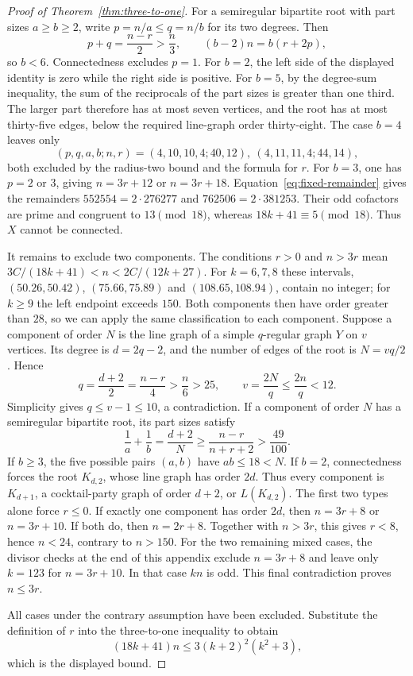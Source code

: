 \documentclass[a4paper,10pt,reqno]{amsart}
\theoremstyle{plain}
\theoremstyle{definition}
\theoremstyle{remark}
\begin{document}
\begin{proof}[Proof of Theorem~\ref{thm:three-to-one}]
 For a semiregular bipartite root with part sizes \(a\ge b\ge2\),
 write \(p=n/a\le q=n/b\) for its two degrees.  Then
 \[
  p+q=\frac{n-r}{2}>\frac n3,
  \qquad (b-2)n=b(r+2p),
 \]
 so \(b<6\).  Connectedness excludes \(p=1\).  For \(b=2\), the
 left side of the displayed identity is zero while the right side is
 positive.  For \(b=5\), by the degree-sum inequality, the sum of the
 reciprocals of the part sizes is greater than one third.  The larger part
 therefore has at most seven vertices, and the root has at most thirty-five
 edges, below the required line-graph order thirty-eight.  The case \(b=4\) leaves only
 \[
  (p,q,a,b;n,r)=(4,10,10,4;40,12),\ (4,11,11,4;44,14),
 \]
 both excluded by the radius-two bound and the formula for \(r\).
 For \(b=3\), one has \(p=2\) or \(3\), giving \(n=3r+12\) or
 \(n=3r+18\).  Equation~\eqref{eq:fixed-remainder} gives the remainders
 \(552554=2\cdot276277\) and \(762506=2\cdot381253\).  Their odd cofactors
 are prime and congruent to \(13\pmod {18}\), whereas \(18k+41\equiv5
 \pmod {18}\).  Thus \(X\) cannot be connected.

It remains to exclude two components. The conditions \(r>0\) and \(n>3r\)
mean \(3C/(18k+41)<n<2C/(12k+27)\). For \(k=6,7,8\) these intervals,
\((50.26,50.42)\), \((75.66,75.89)\) and \((108.65,108.94)\), contain no
integer; for \(k\ge9\) the left endpoint exceeds \(150\). Both components
then have order greater than \(28\), so
we can apply the same classification to each component.  Suppose a component
of order \(N\) is the line graph of a simple \(q\)-regular graph \(Y\)
on \(v\) vertices.  Its degree is \(d=2q-2\), and the number of edges
of the root is \(N=vq/2\).  Hence
\[
 q=\frac{d+2}{2}=\frac{n-r}{4}>\frac n6>25,
 \qquad
 v=\frac{2N}{q}\le\frac{2n}{q}<12.
\]
Simplicity gives \(q\le v-1\le10\), a contradiction.  If a component
of order \(N\) has a semiregular bipartite root, its part sizes satisfy
 \[
  \frac1a+\frac1b=\frac{d+2}{N}
  \ge\frac{n-r}{n+r+2}>\frac{49}{100}.
 \]
 If \(b\ge3\), the five possible pairs \((a,b)\) have \(ab\le18<N\).
 If \(b=2\), connectedness forces the root \(K_{d,2}\), whose line graph has
 order \(2d\).  Thus every component is \(K_{d+1}\), a cocktail-party graph
 of order \(d+2\), or \(L(K_{d,2})\).  The first two types alone force
 \(r\le0\).  If exactly one component has order \(2d\), then
\(n=3r+8\) or \(n=3r+10\). If both do, then \(n=2r+8\). Together with \(n>3r\), this gives \(r<8\), hence \(n<24\),
  contrary to \(n>150\). For the two remaining mixed cases,
  the divisor checks at the end of this appendix exclude
  \(n=3r+8\) and leave only \(k=123\) for \(n=3r+10\).
  In that case \(kn\) is odd. This final contradiction proves \(n\le3r\).

All cases under the contrary assumption have been excluded. Substitute
the definition of \(r\) into the three-to-one inequality to obtain
 \[
  (18k+41)n\le3(k+2)^2(k^2+3),
 \]
 which is the displayed bound.
\end{proof}
\end{document}

